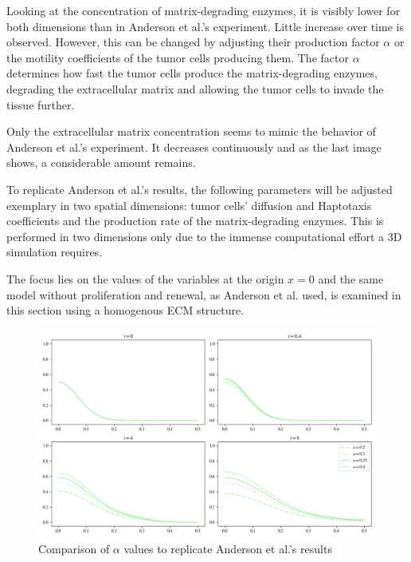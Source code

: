 Looking at the concentration of matrix-degrading enzymes, it is visibly lower for both dimensions than in Anderson et al.'s experiment. Little increase over time is observed. However, this can be changed by adjusting their production factor $\alpha$ or the motility coefficients of the tumor cells producing them. The factor $\alpha$ determines how fast the tumor cells produce the matrix-degrading enzymes, degrading the extracellular matrix and allowing the tumor cells to invade the tissue further.

Only the extracellular matrix concentration seems to mimic the behavior of Anderson et al.'s experiment. It decreases continuously and as the last image shows, a considerable amount remains.

To replicate Anderson et al.'s results, the following parameters will be adjusted exemplary in two spatial dimensions: tumor cells' diffusion and Haptotaxis coefficients and the production rate of the matrix-degrading enzymes. This is performed in two dimensions only due to the immense computational effort a 3D simulation requires.

The focus lies on the values of the variables at the origin $x=0$ and the same model without proliferation and renewal, as Anderson et al. used, is examined in this section using a homogenous ECM structure.

\begin{figure}[!htb]
 \centering
 \includegraphics[width=\textwidth]{resources/images/alpha_comparison.png}
 \caption{Comparison of $\alpha$ values to replicate Anderson et al.'s results}
 \label{fig:replication_alpha_comparison}
\end{figure}

